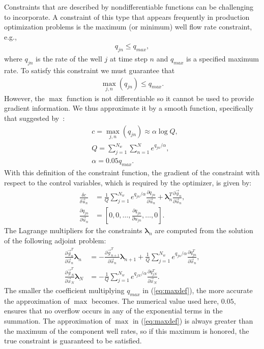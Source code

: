 \documentclass[twocolumn,numbook]{svjour3}          %
\newcommand{\pder}[2]{\frac{\partial #1}{\partial #2}}
\def\u{{\vec u}}
\def\x{{\vec x}}
\def\p{{\vec{g}}}
\def\blambda{{\pmb{\lambda}}}%
\begin{document}
Constraints that are described by nondifferentiable functions can be challenging
to incorporate. A constraint of this type that appears frequently in production
optimization problems is the maximum (or minimum) well flow rate constraint,
e.g.,
%
\begin{align}
q_{jn} \leq q_{max},
\end{align}
%
where $q_{jn}$ is the rate of the well $j$ at time step $n$ and $q_{max}$ is a specified maximum rate.
To satisfy this constraint we must guarantee that
\begin{align}
\max_{j,n}{(q_{jn})} \leq q_{max}.
\end{align}
However, the $\max$ function is not differentiable 
so it cannot be used to provide
gradient information.  We thus approximate it by a smooth
function, specifically that suggested by~\cite{Bertsekas}:
%
\begin{align} \label{eq:maxdef} &c = \max_{j,n}(q_{jn}) \approx \alpha
\log{Q}, \nonumber \\
&Q = \sum_{j=1}^{N_w}\sum_{n=1}^{N} e^{q_{jn}/\alpha}, \\ 
&\alpha = 0.05 q_{max}. \end{align}
%
With this definition of the constraint
function, the gradient of the constraint with respect to the control variables,
  which is required by the optimizer, is given by:
\begin{align} \label{eq:constraintGradient} \frac{\delta c}{\delta \u_n} &=
\frac{1}{Q}\sum_{j=1}^{N_w} e^{q_{jn}/\alpha} \pder{q_{jn}}{\u_n} +\blambda^T_n\pder{\p_n}{\u_n},  
\nonumber \\
\pder{q_{jn}}{\u_{n}} &= \left [ 0, 0, \ldots, \pder{q_{jn}}{u_{jn}}, \ldots, 0 \right ].
\end{align}
%
The Lagrange multipliers for the constraints $\blambda_n$ are
computed from the solution of the following adjoint problem:
  \begin{align}
\label{eq:discreteODEConstraints}
 \pder{\p_n^T}{\x_n}  \blambda_n &= -
\pder{\p_{n+1}^T}{\x_n} \blambda_{n+1} + 
\frac{1}{Q}\sum_{j=1}^{N_w} e^{q_{jn}/\alpha} \pder{q^T_{jn}}{\x_n}, 
\\
\label{eq:discreteBCConstraints}
\pder{\p_N^T}{\x_N} \blambda_N &= -
\frac{1}{Q}\sum_{j=1}^{N_w} e^{q_{jN}/\alpha} \pder{q^T_{jN}}{\x_N}.
\end{align}
The smaller the coefficient multiplying $q_{max}$ in (\ref{eq:maxdef}), the more accurate the
approximation of $\max$ becomes. The numerical value used here, $0.05$, ensures
that no overflow occurs in any of the exponential terms in the summation. The
approximation of $\max$ in (\ref{eq:maxdef}) is always greater than the maximum
of the component well rates, so if this maximum is honored, the true constraint
is guaranteed to be satisfied.
\end{document}
